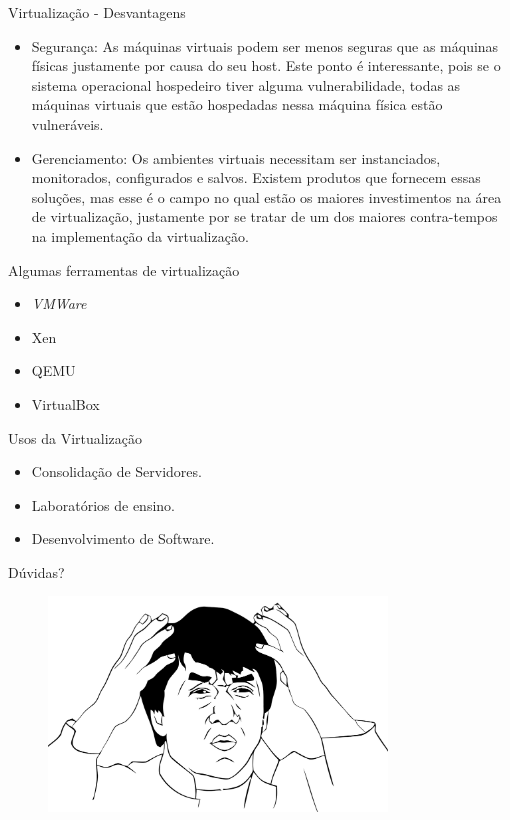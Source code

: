 \documentclass{beamer}
\begin{document}
\begin{frame}{Virtualização - Desvantagens}
\begin{itemize}
\item Segurança: As máquinas virtuais podem ser menos seguras que as máquinas físicas justamente por causa do seu host. Este ponto
é interessante, pois se o sistema operacional hospedeiro tiver alguma vulnerabilidade, todas as máquinas virtuais que estão
hospedadas nessa máquina física estão vulneráveis.
\item Gerenciamento: Os ambientes virtuais necessitam ser instanciados, monitorados, configurados e salvos. Existem produtos que
fornecem essas soluções, mas esse é o campo no qual estão os maiores investimentos na área de virtualização, justamente por se
tratar de um dos maiores contra-tempos na implementação da virtualização.
\end{itemize}
\end{frame}


\begin{frame}{Algumas ferramentas de virtualização}
\begin{itemize}
\item {\it VMWare}
\item Xen
\item QEMU
\item VirtualBox
\end{itemize}
\end{frame}

\begin{frame}{Usos da Virtualização}
\begin{itemize}
 \item Consolidação de Servidores.
 \item Laboratórios de ensino.
 \item Desenvolvimento de Software.

\end{itemize}

 
\end{frame}


\begin{frame}{Dúvidas?}
\begin{figure}[hbtp]
\centering
\includegraphics[width=9cm]{Images/duvidas.png}
\label{figRotulo}
\end{figure}
\end{frame}
\end{document}
